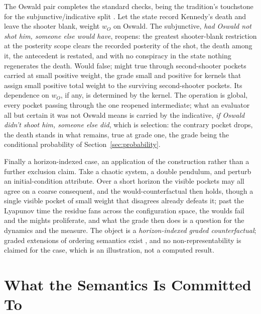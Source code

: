 The Oswald pair completes the standard checks, being the tradition's touchstone for the subjunctive/indicative split \parencite{adams1975}. Let the state record Kennedy's death and leave the shooter blank, weight $w_O$ on Oswald. The subjunctive, \emph{had Oswald not shot him, someone else would have}, reopens: the greatest shooter-blank restriction at the posterity scope clears the recorded posterity of the shot, the death among it, the antecedent is restated, and with no conspiracy in the state nothing regenerates the death. Would false; might true through second-shooter pockets carried at small positive weight, the grade small and positive for kernels that assign small positive total weight to the surviving second-shooter pockets. Its dependence on $w_O$, if any, is determined by the kernel.%
 The operation is global, every pocket passing through the one reopened intermediate; what an evaluator all but certain it was not Oswald means is carried by the indicative, \emph{if Oswald didn't shoot him, someone else did}, which is selection: the contrary pocket drops, the death stands in what remains, true at grade one, the grade being the conditional probability of Section~\ref{sec:probability}.

Finally a horizon-indexed case, an application of the construction rather than a further exclusion claim. Take a chaotic system, a double pendulum, and perturb an initial-condition attribute. Over a short horizon the visible pockets may all agree on a coarse consequent, and the would-counterfactual then holds, though a single visible pocket of small weight that disagrees already defeats it; past the Lyapunov time the residue fans across the configuration space, the woulds fail and the mights proliferate, and what the grade then does is a question for the dynamics and the measure. The object is a \emph{horizon-indexed graded counterfactual}; graded extensions of ordering semantics exist \parencite{leitgeb2012a}, and no non-representability is claimed for the case, which is an illustration, not a computed result.



\section{What the Semantics Is Committed To}\label{sec:commitments}

